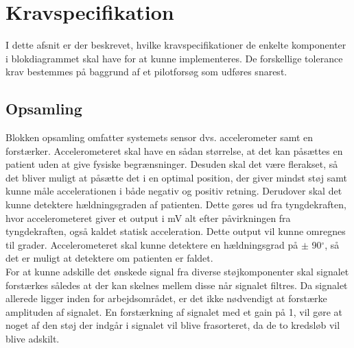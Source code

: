 \section{Kravspecifikation}
I dette afsnit er der beskrevet, hvilke kravspecifikationer de enkelte komponenter i blokdiagrammet skal have for at kunne implementeres. De forskellige tolerance krav bestemmes på baggrund af et pilotforsøg som udføres snarest.

\subsection{Opsamling}
Blokken opsamling omfatter systemets sensor dvs. accelerometer samt en forstærker. Accelerometeret skal have en sådan størrelse, at det kan påsættes en patient uden at give fysiske begrænsninger. Desuden skal det være flerakset, så det bliver muligt at påsætte det i en optimal position, der giver mindst støj samt kunne måle accelerationen i både negativ og positiv retning. Derudover skal det kunne detektere hældningsgraden af patienten. Dette gøres ud fra tyngdekraften, hvor accelerometeret giver et output i mV alt efter påvirkningen fra tyngdekraften, også kaldet statisk acceleration. Dette output vil kunne omregnes til grader. Accelerometeret skal kunne detektere en hældningsgrad på $\pm$ 90$^{\circ}$, så det er muligt at detektere om patienten er faldet. \\
For at kunne adskille det ønskede signal fra diverse støjkomponenter skal signalet forstærkes således at der kan skelnes mellem disse når signalet filtres. Da signalet allerede ligger inden for arbejdsområdet, er det ikke nødvendigt at forstærke amplituden af signalet. En forstærkning af signalet med et gain på 1, vil gøre at noget af den støj der indgår i signalet vil blive frasorteret, da de to kredsløb vil blive adskilt.
